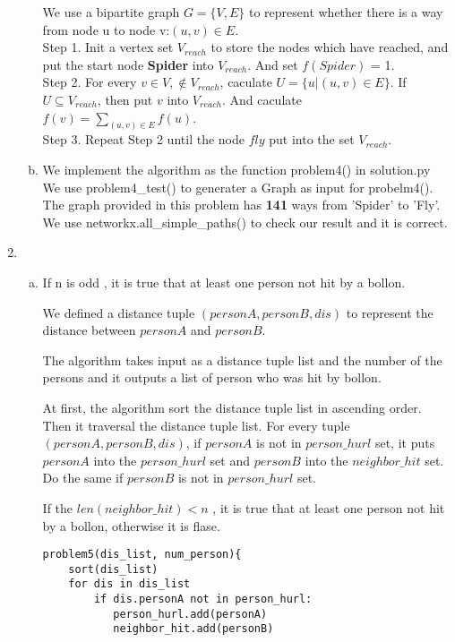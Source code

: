 \documentclass[12pt]{article}
\begin{document}
\begin{enumerate}
\begin{enumerate}[(a)]
   We use a bipartite graph $G = \{V, E\}$ to represent whether there is a way from node u to node v:$(u, v) \in E$.\\
   Step 1. Init a vertex set $V_{reach}$ to store the nodes which have reached, and put the start node \textbf{Spider} into $V_{reach}$. And set $f(Spider)$ = 1.\\
   Step 2.  For every $v \in V ,\notin V_{reach}$, caculate $U = \{u | (u,v) \in E\}$. If $U \subseteq V_{reach}$, then put $v$ into $V_{reach}$. And caculate $f(v) = \sum_{(u,v) \in E}f(u)$.\\
   Step 3. Repeat Step 2 until the node $fly$ put into the set $V_{reach}$.
      
 \item We implement the algorithm as the function problem4() in solution.py\\
   We use problem4\_test() to generater a Graph as input for probelm4().\\
   The graph provided in this problem has \textbf{141} ways from 'Spider' to 'Fly'. We use networkx.all\_simple\_paths() to check our result and it is correct.

  \end{enumerate}               
  



\newpage
\item
  
\begin{enumerate}[(a)]
\item
  If n is odd , it is true that at least one person not hit by a bollon.
  
  We defined a distance tuple $(personA, personB, dis)$ to represent the distance between $personA$ and $personB$.
  
  The algorithm takes input as a distance tuple list and the number of the persons and it outputs a list of person who was hit by bollon.

  At first, the algorithm sort the distance tuple list in ascending order.
  Then it traversal the distance tuple list. For every tuple $(personA, personB, dis)$, if $personA$ is not in $person\_hurl$ set, it puts $personA$ into the $person\_hurl$ set and $personB$ into the $neighbor\_hit$ set. Do the same if $personB$ is not in $person\_hurl$ set.

  If the $len(neighbor\_hit) < n$ , it is true that at least one person not hit by a bollon, otherwise it is flase.

\begin{verbatim}
problem5(dis_list, num_person){
    sort(dis_list)
    for dis in dis_list
        if dis.personA not in person_hurl:
           person_hurl.add(personA)
           neighbor_hit.add(personB)


\end{verbatim}
\end{enumerate}
\end{enumerate}
\end{document}
